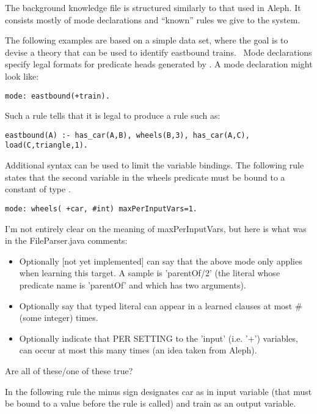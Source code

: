 \documentclass{article}
\begin{document}
The background knowledge file is structured similarly to that used in Aleph.  It consists mostly of mode declarations and ``known'' rules we give to the system.

The following examples are based on a simple data set, where the goal is to devise a theory that can be used to identify eastbound trains.~\cite{Michalski1980}  Mode declarations specify legal formats for predicate heads generated by \will.  A mode declaration might look like:

\begin{verbatim}
mode: eastbound(+train).
\end{verbatim}

Such a rule tells \will that it is legal to produce a rule such as:

\begin{verbatim}
eastbound(A) :- has_car(A,B), wheels(B,3), has_car(A,C), load(C,triangle,1).
\end{verbatim}

Additional syntax can be used to limit the variable bindings.  The following rule states that the second variable in the wheels predicate must be bound to a constant of type .  

\begin{verbatim}
mode: wheels( +car, #int) maxPerInputVars=1.
\end{verbatim}

\begin{rfc}
I'm not entirely clear on the meaning of maxPerInputVars, but here is what was in the FileParser.java comments:
\begin{itemize}
\item Optionally [not yet implemented] can say that the above mode only applies when learning this target.  A sample is 'parentOf/2' (the literal whose predicate name is 'parentOf' and which has two arguments).
\item Optionally say that typed literal can appear in a learned clauses at most \# (some integer) times.
\item Optionally indicate that PER SETTING to the 'input' (i.e. '+') variables, can occur at most this many times (an idea taken from Aleph).
\end{itemize}  
Are all of these/one of these true?
\end{rfc}

In the following rule the minus sign designates car as in input variable (that must be bound to a value before the rule is called) and train as an output variable.
\end{document}
